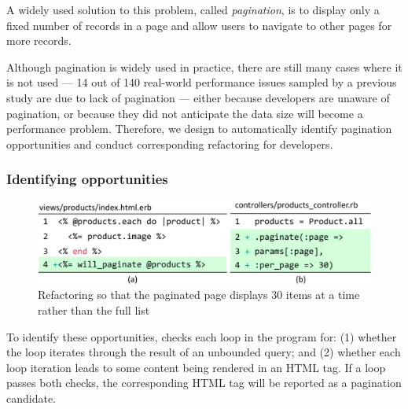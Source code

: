 A widely used solution to this problem, called {\it pagination}, is to display only a fixed number 
of records in a page and allow users to navigate to other pages for more records.


Although pagination is widely used in practice, there are still many cases where it is not used --- 14 out of 140 real-world performance
issues sampled by a previous study \cite{yang:icse18:hloop} are due to lack of pagination
--- either because developers are unaware of pagination, or because they did not anticipate the data size will become a
performance problem. Therefore, we design \ToolP to automatically identify
pagination opportunities and conduct corresponding refactoring 
for developers. 

\subsubsection{Identifying opportunities}


\begin{figure}
    \centering
    \includegraphics[width=\columnwidth]{panorama-figs//paginate.pdf}
    \caption{Refactoring so that the paginated page displays 30 items at a time rather than the full list}
    \label{fig:pagi}
     \vspace{-0.2in}
\end{figure}

To identify these opportunities, \Tool checks each loop in the program for: (1) whether the loop iterates through the result of an unbounded query;
and (2) whether each loop iteration leads to some content being rendered in an HTML tag.
If a loop passes both checks, the corresponding HTML tag will be reported as a pagination candidate.

